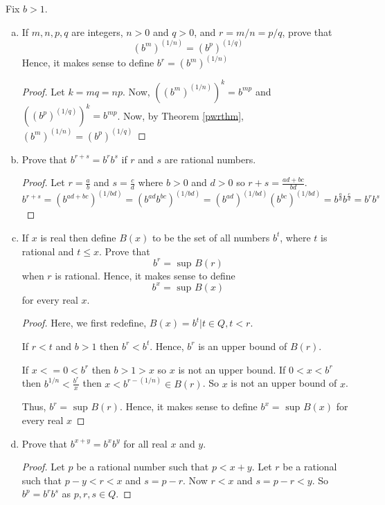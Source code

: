 \begin{prblm}
	Fix $b > 1$.
	\begin{enumerate}[(a)]
		\item If $m, n, p, q$ are integers, $n > 0$ and $q > 0$, and $r = m / n = p / q$, prove that
		$$ (b^m)^{(1/n)} = (b^p)^{(1/q)} $$
		Hence, it makes sense to define $b^r = (b^m)^{(1/n)}$

		\begin{proof}
			Let $k = mq = np$. Now, $((b^m)^{(1/n)})^{k} = b^{mp}$
			and $((b^p)^{(1/q)})^{k} = b^{mp}$.
			Now, by Theorem \ref{pwrthm}, $(b^m)^{(1/n)} = (b^p)^{(1/q)}$
		\end{proof}


		\item Prove that $b^{r+s} = b^r b^s$ if $r$ and $s$ are rational numbers.

		\begin{proof}
			Let $r = \frac{a}{b}$ and $s = \frac{c}{d}$ where $b > 0$ and $d > 0$ so $r + s = \frac{ad + bc}{bd}$.
			$$ b^{r+s} = (b^{ad + bc})^{(1 / bd)}
						= (b^{ad} b^{bc})^{(1/bd)}
						= (b^{ad})^{(1/bd)} (b^{bc})^{(1/bd)}
						= b^{\frac{a}{d}} b^{\frac{c}{d}}
						= b^r b^s $$
		\end{proof}

		\item If $x$ is real then define $B(x)$ to be the set of all numbers $b^t$, where $t$ is rational and $t \leq x$.
		Prove that $$ b^r = \text{ sup } B(r) $$ when $r$ is rational.
		Hence, it makes sense to define $$ b^x = \text{ sup } B(x) $$ for every real $x$.

		\begin{proof}
			Here, we first redefine, $B(x) = { b^t | t \in Q, t < r }$.

			If $r < t$ and $b > 1$ then $b^r < b^t$. Hence, $b^r$ is an upper bound of $B(r)$.

			If $x <= 0 < b^r$ then $b > 1 > x$ so $x$ is not an upper bound.
			If $0 < x < b^r$ then $b^{1/n} < \frac{b^r}{x}$ then $x < b^{r - (1/n)} \in B(r)$. So $x$ is not an upper bound of $x$.

			Thus, $b^r = \text{ sup } B(r)$. Hence, it makes sense to define $b^x = \text{ sup } B(x)$ for every real $x$
		\end{proof}

		\item Prove that $b^{x+y} = b^{x} b^{y}$ for all real $x$ and $y$.

		\begin{proof}
			Let $p$ be a rational number such that $p < x + y$. Let $r$ be a rational such that $p - y < r < x$ and $s = p - r$.
			Now $r < x$ and $s = p - r < y$. So $b^p = b^r b^s$ as $p, r, s \in Q$.


\end{proof}
\end{enumerate}
\end{prblm}

